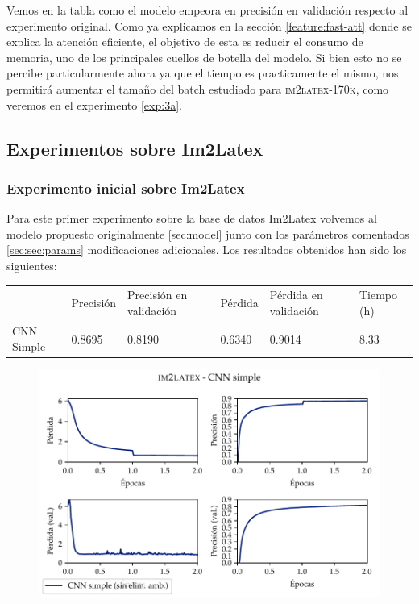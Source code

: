 \documentclass[a4paper, 20pt, dvipsnames]{article}
\begin{document}
Vemos en la tabla como el modelo empeora en precisión en validación respecto al
experimento original. Como ya explicamos en la sección \ref{feature:fast-att}
donde se explica la atención eficiente, el objetivo de esta es reducir el
consumo de memoria, uno de los principales cuellos de botella del modelo. Si
bien esto no se percibe particularmente ahora ya que el tiempo es practicamente
el mismo, nos permitirá aumentar el tamaño del batch estudiado para
\textsc{im2latex-170k}, como veremos en el experimento \ref{exp:3a}.

\subsection{Experimentos sobre Im2Latex}

\subsubsection{Experimento inicial sobre Im2Latex}
\label{exp:1}

Para este primer experimento sobre la base de datos Im2Latex volvemos al modelo propuesto originalmente \ref{sec:model} junto con los parámetros comentados \ref{sec:sec:params} modificaciones adicionales. Los resultados obtenidos han sido los siguientes:

\begin{table}[H]
	\centering
	\begin{tabular}{llllll}
		& Precisión & Precisión en validación & Pérdida & Pérdida en validación & Tiempo (h) \\ \cline{2-6} 
		CNN Simple & 0.8695    & 0.8190                  & 0.6340  & 0.9014                & 8.33      
	\end{tabular}
\end{table}

\begin{figure}[H]
	\centering
	\includegraphics{fig/im2latex-1.pdf}
\end{figure}
\end{document}
